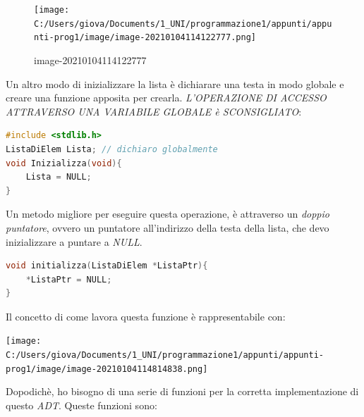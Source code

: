 \documentclass[
  paper=a4,
  oneside  ,captions=tableheading
]{scrbook}
\begin{document}
\begin{figure}
\centering
\texttt{[image: C:/Users/giova/Documents/1\_UNI/programmazione1/appunti/appunti-prog1/image/image-20210104114122777.png]}
\caption{image-20210104114122777}
\end{figure}

Un altro modo di inizializzare la lista è dichiarare una testa in modo
globale e creare una funzione apposita per crearla. \emph{L'OPERAZIONE
DI ACCESSO ATTRAVERSO UNA VARIABILE GLOBALE è SCONSIGLIATO}:

\begin{lstlisting}[language=C]
#include <stdlib.h>
ListaDiElem Lista; // dichiaro globalmente
void Inizializza(void){
    Lista = NULL;
}
\end{lstlisting}

Un metodo migliore per eseguire questa operazione, è attraverso un
\emph{doppio puntatore}, ovvero un puntatore all'indirizzo della testa
della lista, che devo inizializzare a puntare a \emph{NULL}.

\begin{lstlisting}[language=C]
void initializza(ListaDiElem *ListaPtr){
    *ListaPtr = NULL;    
}
\end{lstlisting}

Il concetto di come lavora questa funzione è rappresentabile con:

\texttt{[image: C:/Users/giova/Documents/1\_UNI/programmazione1/appunti/appunti-prog1/image/image-20210104114814838.png]}

Dopodichè, ho bisogno di una serie di funzioni per la corretta
implementazione di questo \emph{ADT}. Queste funzioni sono:
\end{document}
